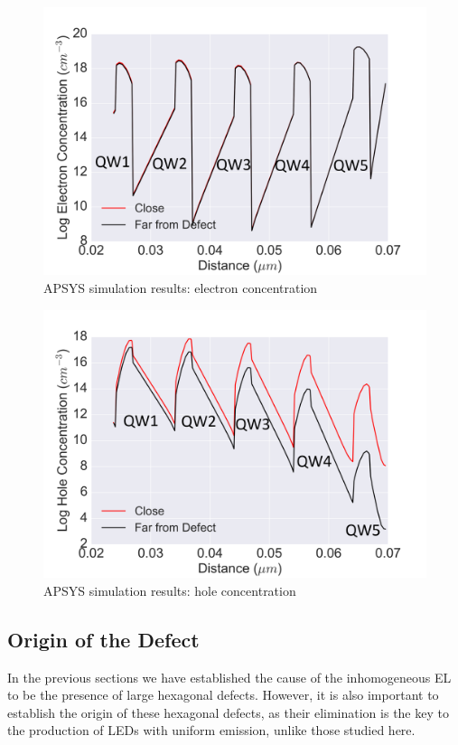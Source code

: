 \begin{figure}[h]
	\centering
	\includegraphics[width=1\textwidth]{Figs/Ch3/shallowelec.png}
	\caption[h] {APSYS simulation results: electron concentration}
	\label{shallow_elec}
\end{figure}
\FloatBarrier 

\begin{figure}[h]
	\centering
	\includegraphics[width=1\textwidth]{Figs/Ch3/shallowhole.png}
	\caption[h] {APSYS simulation results: hole concentration}
	\label{shallow_hole}
\end{figure}
\FloatBarrier 


\subsection{Origin of the Defect}
In the previous sections we have established the cause of the inhomogeneous EL to be the presence of large hexagonal defects. However, it is also important to establish the origin of these hexagonal defects, as their elimination is the key to the production of LEDs with uniform emission, unlike those studied here.


